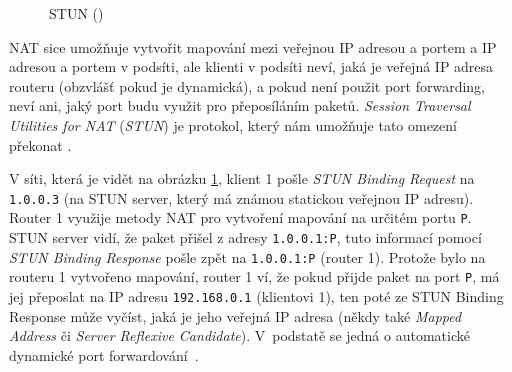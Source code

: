 \begin{figure}[H]
	\centering
	\caption{STUN (\publicPrivateIP)}
	\label{stun}
\end{figure}

NAT sice umožňuje vytvořit mapování mezi veřejnou IP adresou a portem a IP
adresou a portem v podsíti, ale klienti v podsíti neví, jaká je veřejná IP
adresa routeru (obzvlášť pokud je dynamická), a pokud není použit port
forwarding, neví ani, jaký port budu využit pro přeposíláním paketů.
\textit{Session Traversal Utilities for NAT} (\textit{STUN}) je protokol, který
nám umožňuje tato omezení překonat \cite{WebRTCForTheCurious}.

V síti, která je vidět na obrázku \ref{stun}, klient 1 pošle \textit{STUN
Binding Request} na \texttt{1.0.0.3} (na STUN server, který má známou
statickou veřejnou IP adresu). Router 1 využije metody NAT pro vytvoření
mapování na určitém portu \texttt{P}. STUN server vidí, že paket
přišel z adresy \texttt{1.0.0.1:P}, tuto informací pomocí \textit{STUN
Binding Response} pošle zpět na \texttt{1.0.0.1:P} (router 1). Protože
bylo na routeru 1 vytvořeno mapování, router 1 ví, že pokud přijde paket na port
\texttt{P}, má jej přeposlat na IP adresu
\texttt{192.168.0.1} (klientovi 1), ten poté ze STUN Binding Response
může vyčíst, jaká je jeho veřejná IP adresa (někdy také \textit{Mapped Address}
či \textit{Server Reflexive Candidate}). V~podstatě se jedná o automatické
dynamické port forwardování~\cite{WebRTCForTheCurious}.

